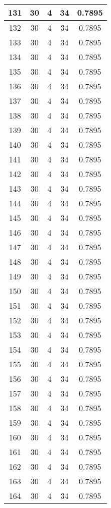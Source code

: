 \documentclass[letterpaper, 12pt]{article}
\begin{document}
\begin{longtable}{|c|c|c|c|c|}
\hline
131 & 30 & 4 & 34 & 0.7895 \\
\hline
132 & 30 & 4 & 34 & 0.7895 \\
\hline
133 & 30 & 4 & 34 & 0.7895 \\
\hline
134 & 30 & 4 & 34 & 0.7895 \\
\hline
135 & 30 & 4 & 34 & 0.7895 \\
\hline
136 & 30 & 4 & 34 & 0.7895 \\
\hline
137 & 30 & 4 & 34 & 0.7895 \\
\hline
138 & 30 & 4 & 34 & 0.7895 \\
\hline
139 & 30 & 4 & 34 & 0.7895 \\
\hline
140 & 30 & 4 & 34 & 0.7895 \\
\hline
141 & 30 & 4 & 34 & 0.7895 \\
\hline
142 & 30 & 4 & 34 & 0.7895 \\
\hline
143 & 30 & 4 & 34 & 0.7895 \\
\hline
144 & 30 & 4 & 34 & 0.7895 \\
\hline
145 & 30 & 4 & 34 & 0.7895 \\
\hline
146 & 30 & 4 & 34 & 0.7895 \\
\hline
147 & 30 & 4 & 34 & 0.7895 \\
\hline
148 & 30 & 4 & 34 & 0.7895 \\
\hline
149 & 30 & 4 & 34 & 0.7895 \\
\hline
150 & 30 & 4 & 34 & 0.7895 \\
\hline
151 & 30 & 4 & 34 & 0.7895 \\
\hline
152 & 30 & 4 & 34 & 0.7895 \\
\hline
153 & 30 & 4 & 34 & 0.7895 \\
\hline
154 & 30 & 4 & 34 & 0.7895 \\
\hline
155 & 30 & 4 & 34 & 0.7895 \\
\hline
156 & 30 & 4 & 34 & 0.7895 \\
\hline
157 & 30 & 4 & 34 & 0.7895 \\
\hline
158 & 30 & 4 & 34 & 0.7895 \\
\hline
159 & 30 & 4 & 34 & 0.7895 \\
\hline
160 & 30 & 4 & 34 & 0.7895 \\
\hline
161 & 30 & 4 & 34 & 0.7895 \\
\hline
162 & 30 & 4 & 34 & 0.7895 \\
\hline
163 & 30 & 4 & 34 & 0.7895 \\
\hline
164 & 30 & 4 & 34 & 0.7895 \\

\end{longtable}
\end{document}
